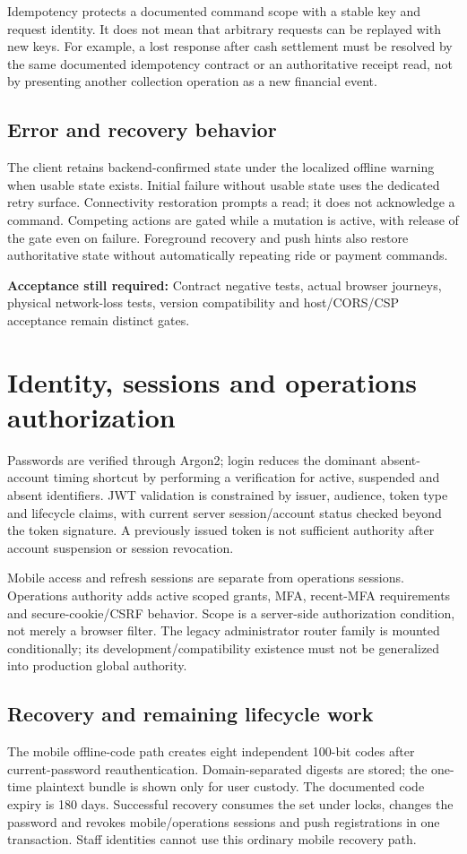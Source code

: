 \documentclass[11pt,a4paper]{article}
\newcommand{\gate}[1]{\par\textbf{Acceptance still required:} #1\par}
\begin{document}
Idempotency protects a documented command scope with a stable key and request
identity. It does not mean that arbitrary requests can be replayed with new keys.
For example, a lost response after cash settlement must be resolved by the same
documented idempotency contract or an authoritative receipt read, not by presenting
another collection operation as a new financial event.

\subsection{Error and recovery behavior}
The client retains backend-confirmed state under the localized offline warning
when usable state exists. Initial failure without usable state uses the dedicated
retry surface. Connectivity restoration prompts a read; it does not acknowledge
a command. Competing actions are gated while a mutation is active, with release
of the gate even on failure. Foreground recovery and push hints also restore
authoritative state without automatically repeating ride or payment commands.
\gate{Contract negative tests, actual browser journeys, physical network-loss
tests, version compatibility and host/CORS/CSP acceptance remain distinct gates.}

\section{Identity, sessions and operations authorization}
Passwords are verified through Argon2; login reduces the dominant absent-account
timing shortcut by performing a verification for active, suspended and absent
identifiers. JWT validation is constrained by issuer, audience, token type and
lifecycle claims, with current server session/account status checked beyond the
token signature. A previously issued token is not sufficient authority after
account suspension or session revocation.

Mobile access and refresh sessions are separate from operations sessions.
Operations authority adds active scoped grants, MFA, recent-MFA requirements and
secure-cookie/CSRF behavior. Scope is a server-side authorization condition,
not merely a browser filter. The legacy administrator router family is mounted
conditionally; its development/compatibility existence must not be generalized
into production global authority.

\subsection{Recovery and remaining lifecycle work}
The mobile offline-code path creates eight independent 100-bit codes after
current-password reauthentication. Domain-separated digests are stored; the
one-time plaintext bundle is shown only for user custody. The documented code
expiry is 180 days. Successful recovery consumes the set under locks, changes
the password and revokes mobile/operations sessions and push registrations in
one transaction. Staff identities cannot use this ordinary mobile recovery path.
\end{document}
